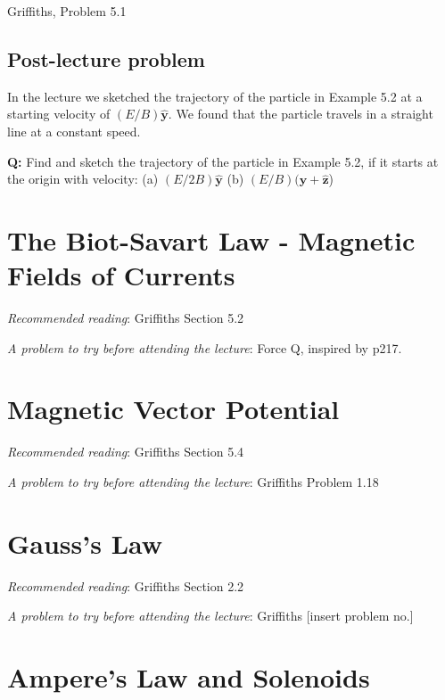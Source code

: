 \documentclass[
  letterpaper,
  DIV=11,
  numbers=noendperiod]{scrreprt}
\begin{document}
Griffiths, Problem 5.1

\section{Post-lecture problem}\label{post-lecture-problem-3}

In the lecture we sketched the trajectory of the particle in Example 5.2
at a starting velocity of \((E/B) \hat{\mathrm{\mathbf{y}}}\). We found
that the particle travels in a straight line at a constant speed.

\textbf{Q:} Find and sketch the trajectory of the particle in Example
5.2, if it starts at the origin with velocity: (a)
\((E/2B) \hat{\mathrm{\mathbf{y}}}\) (b)
\((E/B) (\hat{\mathrm{\mathbf{y}}} + \hat{\mathrm{\mathbf{z}}}\))


\chapter{The Biot-Savart Law - Magnetic Fields of
Currents}\label{the-biot-savart-law---magnetic-fields-of-currents}

\emph{Recommended reading}: Griffiths Section 5.2

\emph{A problem to try before attending the lecture}: Force Q, inspired
by p217.


\chapter{Magnetic Vector Potential}\label{magnetic-vector-potential}

\emph{Recommended reading}: Griffiths Section 5.4

\emph{A problem to try before attending the lecture}: Griffiths Problem
1.18


\chapter{Gauss's Law}\label{gausss-law}

\emph{Recommended reading}: Griffiths Section 2.2

\emph{A problem to try before attending the lecture}: Griffiths
{[}insert problem no.{]}


\chapter{Ampere's Law and Solenoids}\label{amperes-law-and-solenoids}
\end{document}
